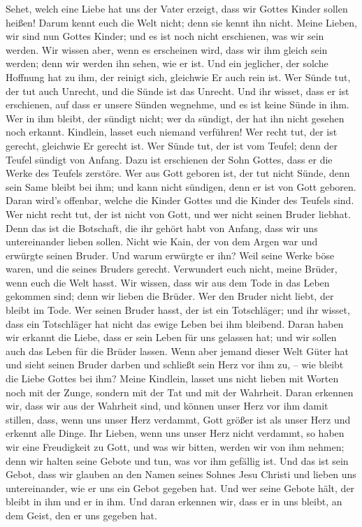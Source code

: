  Sehet, welch eine Liebe hat uns der Vater erzeigt, dass
wir Gottes Kinder sollen heißen! Darum kennt euch die Welt nicht; denn
sie kennt ihn nicht.  Meine Lieben, wir sind nun Gottes
Kinder; und es ist noch nicht erschienen, was wir sein werden. Wir
wissen aber, wenn es erscheinen wird, dass wir ihm gleich sein werden;
denn wir werden ihn sehen, wie er ist.  Und ein jeglicher,
der solche Hoffnung hat zu ihm, der reinigt sich, gleichwie Er auch rein
ist.  Wer Sünde tut, der tut auch Unrecht, und die Sünde
ist das Unrecht.  Und ihr wisset, dass er ist erschienen,
auf dass er unsere Sünden wegnehme, und es ist keine Sünde in ihm.
 Wer in ihm bleibt, der sündigt nicht; wer da sündigt, der
hat ihn nicht gesehen noch erkannt.  Kindlein, lasset euch
niemand verführen! Wer recht tut, der ist gerecht, gleichwie Er gerecht
ist.  Wer Sünde tut, der ist vom Teufel; denn der Teufel
sündigt von Anfang. Dazu ist erschienen der Sohn Gottes, dass er die
Werke des Teufels zerstöre.  Wer aus Gott geboren ist, der
tut nicht Sünde, denn sein Same bleibt bei ihm; und kann nicht sündigen,
denn er ist von Gott geboren.  Daran wird's offenbar,
welche die Kinder Gottes und die Kinder des Teufels sind. Wer nicht
recht tut, der ist nicht von Gott, und wer nicht seinen Bruder liebhat.
 Denn das ist die Botschaft, die ihr gehört habt von
Anfang, dass wir uns untereinander lieben sollen.  Nicht
wie Kain, der von dem Argen war und erwürgte seinen Bruder. Und warum
erwürgte er ihn? Weil seine Werke böse waren, und die seines Bruders
gerecht.  Verwundert euch nicht, meine Brüder, wenn euch
die Welt hasst.  Wir wissen, dass wir aus dem Tode in das
Leben gekommen sind; denn wir lieben die Brüder. Wer den Bruder nicht
liebt, der bleibt im Tode.  Wer seinen Bruder hasst, der
ist ein Totschläger; und ihr wisset, dass ein Totschläger hat nicht das
ewige Leben bei ihm bleibend.  Daran haben wir erkannt
die Liebe, dass er sein Leben für uns gelassen hat; und wir sollen auch
das Leben für die Brüder lassen.  Wenn aber jemand dieser
Welt Güter hat und sieht seinen Bruder darben und schließt sein Herz vor
ihm zu, -- wie bleibt die Liebe Gottes bei ihm?  Meine
Kindlein, lasset uns nicht lieben mit Worten noch mit der Zunge, sondern
mit der Tat und mit der Wahrheit.  Daran erkennen wir,
dass wir aus der Wahrheit sind, und können unser Herz vor ihm damit
stillen,  dass, wenn uns unser Herz verdammt, Gott größer
ist als unser Herz und erkennt alle Dinge.  Ihr Lieben,
wenn uns unser Herz nicht verdammt, so haben wir eine Freudigkeit zu
Gott,  und was wir bitten, werden wir von ihm nehmen;
denn wir halten seine Gebote und tun, was vor ihm gefällig ist.
 Und das ist sein Gebot, dass wir glauben an den Namen
seines Sohnes Jesu Christi und lieben uns untereinander, wie er uns ein
Gebot gegeben hat.  Und wer seine Gebote hält, der bleibt
in ihm und er in ihm. Und daran erkennen wir, dass er in uns bleibt, an
dem Geist, den er uns gegeben hat.

